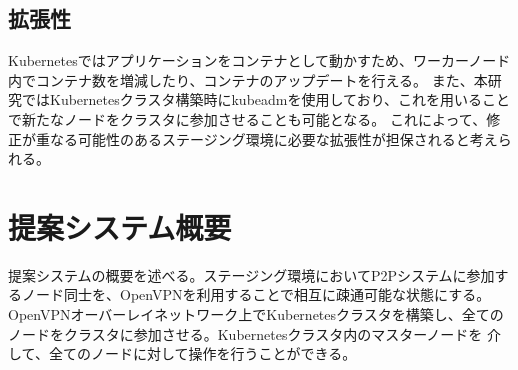\subsection{拡張性}
Kubernetesではアプリケーションをコンテナとして動かすため、ワーカーノード内でコンテナ数を増減したり、コンテナのアップデートを行える。
また、本研究ではKubernetesクラスタ構築時にkubeadmを使用しており、これを用いることで新たなノードをクラスタに参加させることも可能となる。
これによって、修正が重なる可能性のあるステージング環境に必要な拡張性が担保されると考えられる。

\section{提案システム概要}
\label{issue:about-system}
提案システムの概要を述べる。ステージング環境においてP2Pシステムに参加するノード同士を、OpenVPNを利用することで相互に疎通可能な状態にする。
OpenVPNオーバーレイネットワーク上でKubernetesクラスタを構築し、全てのノードをクラスタに参加させる。Kubernetesクラスタ内のマスターノードを
介して、全てのノードに対して操作を行うことができる。

